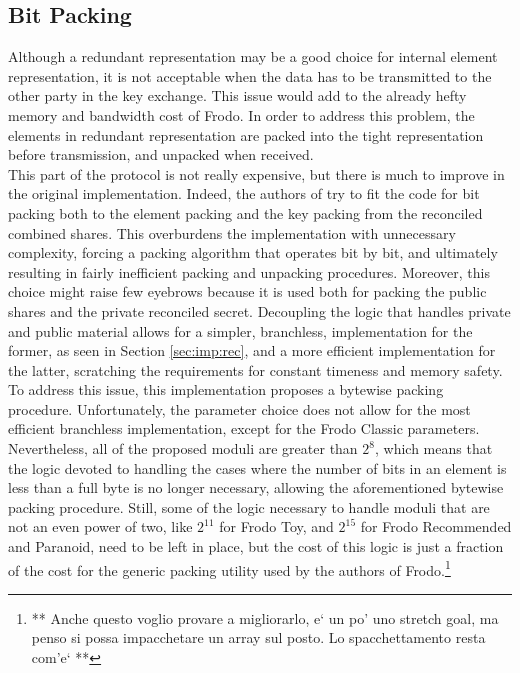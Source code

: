 \subsection{Bit Packing}
Although a redundant representation may be a good choice for internal element representation, it is not acceptable when the data has to be transmitted to the other party in the key exchange. This issue would add to the already hefty memory and bandwidth cost of Frodo. In order to address this problem, the elements in redundant representation are packed into the tight representation before transmission, and unpacked when received.\\
This part of the protocol is not really expensive, but there is much to improve in the original implementation. Indeed, the authors of \cite{frodo} try to fit the code for bit packing both to the element packing and the key packing from the reconciled combined shares. This overburdens the implementation with unnecessary complexity, forcing a packing algorithm that operates bit by bit, and ultimately resulting in fairly inefficient packing and unpacking procedures. Moreover, this choice might raise few eyebrows because it is used both for packing the public shares and the private reconciled secret. Decoupling the logic that handles private and public material allows for a simpler, branchless, implementation for the former, as seen in Section \ref{sec:imp:rec}, and a more efficient implementation for the latter, scratching the requirements for constant timeness and memory safety.\\
To address this issue, this implementation proposes a bytewise packing procedure. Unfortunately, the parameter choice does not allow for the most efficient branchless implementation, except for the Frodo Classic parameters. Nevertheless, all of the proposed moduli are greater than $2^8$, which means that the logic devoted to handling the cases where the number of bits in an element is less than a full byte is no longer necessary, allowing the aforementioned bytewise packing procedure. Still, some of the logic necessary to handle moduli that are not an even power of two, like $2^{11}$ for Frodo Toy, and $2^{15}$ for Frodo Recommended and Paranoid, need to be left in place, but the cost of this logic is just a  fraction of the cost for the generic packing utility used by the authors of Frodo.\footnote{** Anche questo voglio provare a migliorarlo, e` un po' uno stretch goal, ma penso si possa impacchetare un array sul posto. Lo spacchettamento resta com'e` **}

